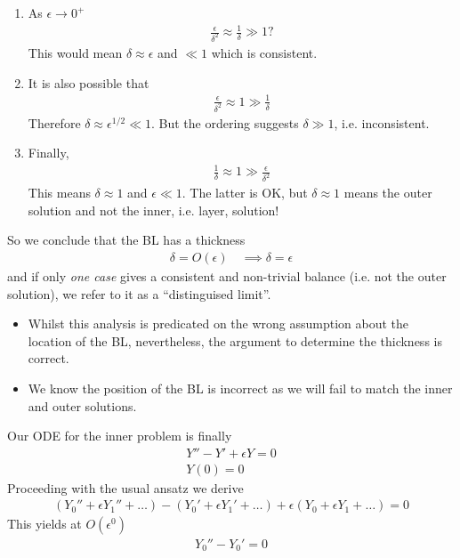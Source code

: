 \begin{enumerate}
	\item As $\epsilon \rightarrow 0^+$ \begin{gather*}
		\frac{\epsilon}{\delta^2} \approx \frac{1}{\delta} \gg 1 ?
	\end{gather*}
	This would mean $\delta \approx \epsilon $ and $\ll 1$ which is consistent. 
	\item It is also possible that
	\begin{gather*}
		\frac{\epsilon}{\delta^2} \approx 1 \gg \frac{1}{\delta}
	\end{gather*}
	Therefore $\delta \approx \epsilon^{1/2} \ll 1$. But the ordering suggests $\delta \gg 1$, i.e. inconsistent.
	\item Finally, 
	\begin{gather*}
		\frac{1}{\delta} \approx 1 \gg \frac{\epsilon}{\delta^2}
	\end{gather*}  
	This means $\delta \approx 1$ and $\epsilon \ll 1$. The latter is OK, but $\delta \approx 1$ means the outer solution and not the inner, i.e. layer, solution!  
\end{enumerate}
So we conclude that the BL has a thickness
\begin{gather*}
	\delta = O(\epsilon) \quad \implies \delta = \epsilon
\end{gather*}
and if only \emph{one case} gives a consistent and non-trivial balance (i.e. not the outer solution), we refer to it as a ``distinguised limit''. 
\begin{itemize}
	\item Whilst this analysis is predicated on the wrong assumption about the location of the BL, nevertheless, the argument to determine the thickness is correct.
	\item We know the position of the BL is incorrect as we will fail to match the inner and outer solutions. 
\end{itemize}
Our ODE for the inner problem is finally
\begin{gather*}
	Y'' - Y' + \epsilon Y = 0 \\
	Y(0) = 0
\end{gather*}
Proceeding with the usual ansatz we derive
\begin{gather*}
	(Y_0'' + \epsilon Y_1'' + \dots) - (Y_0' + \epsilon Y_1' + \dots ) + \epsilon (Y_0 + \epsilon Y_1 + \dots) = 0
\end{gather*}
This yields at $O(\epsilon^0)$
\begin{gather*}
	Y_0'' - Y_0' = 0
\end{gather*}
